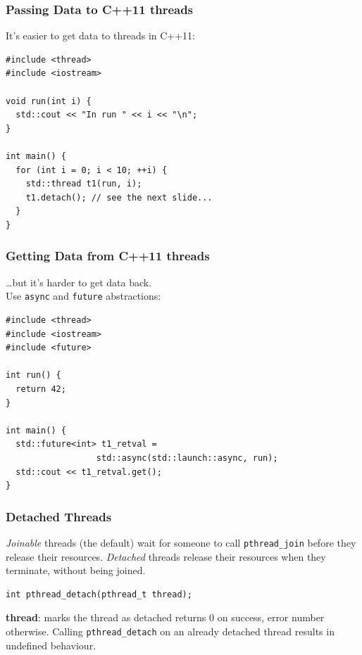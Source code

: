 \begin{frame}[fragile]
  \frametitle{Passing Data to C++11 threads}

It's easier to get data to threads in C++11:
\begin{lstlisting}
#include <thread>
#include <iostream>

void run(int i) {
  std::cout << "In run " << i << "\n";
}

int main() {
  for (int i = 0; i < 10; ++i) {
    std::thread t1(run, i);
    t1.detach(); // see the next slide...
  }
}
\end{lstlisting}

  
\end{frame}

\begin{frame}[fragile]
  \frametitle{Getting Data from C++11 threads}

    \ldots but it's harder to get data back.\\
    Use {\tt async} and {\tt future} abstractions:
    \begin{lstlisting}
#include <thread>
#include <iostream>
#include <future>

int run() {
  return 42;
}

int main() {
  std::future<int> t1_retval =
                  std::async(std::launch::async, run);
  std::cout << t1_retval.get();
}
\end{lstlisting}

  
\end{frame}

\begin{frame}[fragile]
  \frametitle{Detached Threads}


  {\it Joinable} threads (the default) wait for someone to call
  {\tt pthread\_join} before they release their resources.
  \vfill
  {\it Detached} threads release their resources when they terminate, without
  being joined.
  \vfill
  \begin{lstlisting}
int pthread_detach(pthread_t thread);
  \end{lstlisting}
  \vfill
  {\bf thread}: marks the thread as detached
  \vfill
  returns 0 on success, error number otherwise.
  \vfill
  Calling {\tt pthread\_detach} on an already detached thread results in undefined
  behaviour.


\end{frame}

